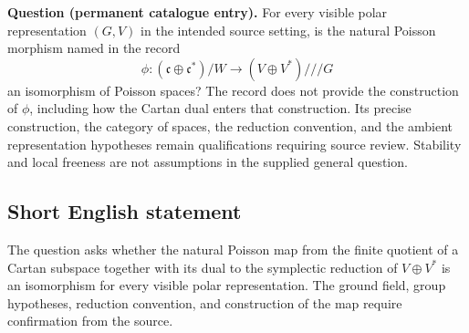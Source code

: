 \documentclass[11pt]{article}
\begin{document}
\textbf{Question (permanent catalogue entry).} For every visible polar representation \((G,V)\) in the intended source setting, is the natural Poisson morphism named in the record
\[
\phi:(\mathfrak c\oplus\mathfrak c^*)/W
\longrightarrow (V\oplus V^*)\mathbin{///}G
\]
an isomorphism of Poisson spaces? The record does not provide the construction of \(\phi\), including how the Cartan dual enters that construction. Its precise construction, the category of spaces, the reduction convention, and the ambient representation hypotheses remain qualifications requiring source review. Stability and local freeness are not assumptions in the supplied general question.
\subsection{Short English statement}
The question asks whether the natural Poisson map from the finite quotient of a Cartan subspace together with its dual to the symplectic reduction of \(V\oplus V^*\) is an isomorphism for every visible polar representation. The ground field, group hypotheses, reduction convention, and construction of the map require confirmation from the source.
\end{document}
